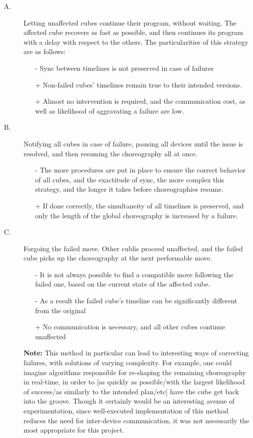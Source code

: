 \begin{description}
\item[A.] Letting unaffected cubes continue their program, without waiting. The affected cube recovers as fast as possible, and then continues its program with a delay with respect to the others.
The particularities of this strategy are as follows:

\begin{itemize}
\item[-] Sync between timelines is not preserved in case of failures
\item[+] Non-failed cubes' timelines remain true to their intended versions.
\item[+] Almost no intervention is required, and the communication cost, as well as likelihood of aggravating a failure are low.
\end{itemize}

\item[B.] Notifying all cubes in case of failure, pausing all devices until the issue is resolved, and then resuming the choreography all at once.

\begin{itemize}
\item[-] The more procedures are put in place to ensure the correct behavior of all cubes, and the exactitude of sync, the more complex this strategy, and the longer it takes before choreographies resume. 
\item[+] If done correctly, the simultaneity of all timelines is preserved, and only the length of the global choreography is increased by a failure.
\end{itemize}

\item[C.] Forgoing the failed move. Other cublis proceed unaffected, and the failed cube picks up the choreography at the next performable move.

\begin{itemize}
\item[-] It is not always possible to find a compatible move following the failed one, based on the current state of the affected cube.
\item[-] As a result the failed cube's timeline can be significantly different from the original
\item[+] No communication is necessary, and all other cubes continue unaffected
\end{itemize}

\textbf{Note:} This method in particular can lead to interesting ways of correcting failures, with solutions of varying complexity. For example, one could imagine algorithms responsible for re-shaping the remaining choreography in real-time, in order to [as quickly as possible/with the largest likelihood of success/as similarly to the intended plan/etc] have the cube get back into the groove.
Though it certainly would be an interesting avenue of experimentation, since well-executed implementation of this method reduces the need for inter-device communication, it was not necessarily the most appropriate for this project.


\end{description}
